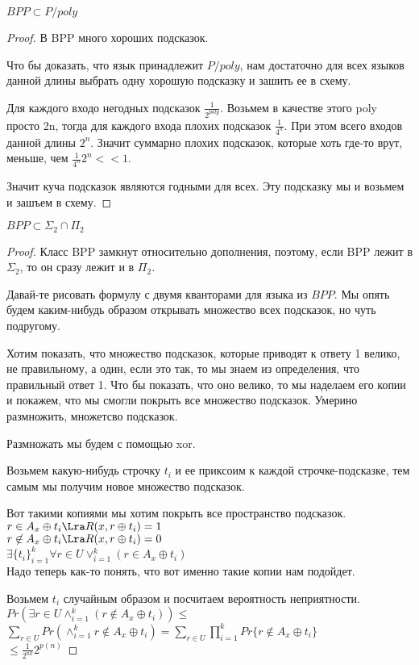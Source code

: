 \begin{theorem}
$BPP \subset P/poly$\\
\end{theorem}
\begin{proof}
В BPP много хороших подсказок. 

Что бы доказать, что язык принадлежит $P/poly$, нам достаточно для всех языков 
данной длины выбрать одну хорошую подсказку и зашить ее в схему.

Для каждого входо негодных подсказок $\frac{1}{2^{poly}} $. Возьмем в качестве этого poly просто 2n, 
тогда для каждого входа плохих подсказок $\frac{1}{4^n}$. При этом всего входов данной длины $2^n$. Значит 
суммарно плохих подсказок, которые хоть где-то врут, меньше, чем $\frac{1}{4^n}2^n << 1$.

Значит куча подсказок являются годными для всех. Эту подсказку мы и возьмем и зашъем в схему.
\end{proof}

\begin {theorem}
$BPP \subset \Sigma_2 \cap \Pi_2$\\
\end{theorem}
\begin{proof}
Класс BPP замкнут относительно дополнения, поэтому, если BPP лежит в $\Sigma_2$, 
то он сразу лежит и в $\Pi_2$.

Давай-те рисовать формулу с двумя кванторами для языка из $BPP$. Мы опять будем каким-нибудь образом 
открывать множество всех подсказок, но чуть подругому. 

Хотим показать, что множество подсказок, которые приводят к ответу 1 велико, не правильному, а один, если это так, 
то мы знаем из определения, что правильный ответ 1. Что бы показать, 
что оно велико, то мы наделаем его копии и покажем, что мы смогли покрыть все множество подсказок. Умерино размножить,  множетсво подсказок. 

Размножать мы будем с помощью xor.

Возьмем какую-нибудь строчку $t_i$ и ее приксоим к каждой строчке-подсказке, тем самым
мы получим новое множество подсказок.

Вот такими копиями мы хотим покрыть все пространство подсказок.
$r \in A_x \oplus t_i \Lra R(x, r \oplus t_i) = 1$ \\
$r \not \in A_x \oplus t_i \Lra R(x, r \oplus t_i) = 0$\\

$\exists\{t_i\}_{i = 1}^{k} \forall r \in U \vee_{i = 1}^{k}(r \in A_x \oplus t_i)$ \\

Надо теперь как-то понять, что вот именно такие копии нам подойдет.

Возьмем $t_i$ случайным образом и посчитаем вероятность неприятности.
$Pr(\exists r\in U \wedge_{i = 1}^{k}(r \not \in A_x \oplus t_i)) \le$\\
$\sum_{r \in U}Pr(\wedge_{i = 1}^{k}r \not \in A_x \oplus t_i) = \sum_{r \in U} \prod_{i = 1}^{k}Pr\{r \not \in A_x \oplus t_i\}$\\
$\le \frac{1}{2^{nk}}2^{p(n)}$ 
\end{proof}


